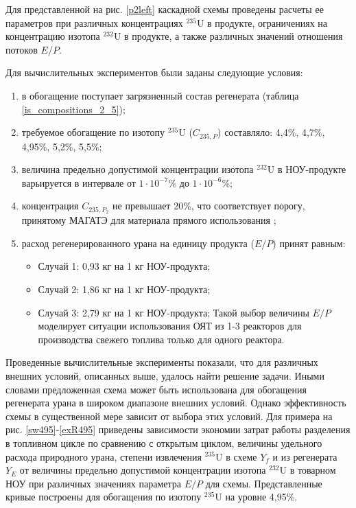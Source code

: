 Для представленной на рис. \ref{p2left} каскадной схемы проведены расчеты ее параметров при различных концентрациях $^{235}$U в продукте, ограничениях на концентрацию изотопа $^{232}$U в продукте, а также различных значений отношения потоков $E$/$P$.

Для вычислительных экспериментов были заданы следующие условия:

\begin{enumerate}
    \item в обогащение поступает загрязненный состав регенерата (таблица \ref{is_compositions_2_5}); 
    \item требуемое обогащение по изотопу $^{235}$U ($C_{235,P}$) составляло: 4,4\%, 4,7\%, 4,95\%, 5,2\%, 5,5\%;    
    \item величина предельно допустимой концентрации изотопа $^{232}$U в НОУ-продукте варьируется в интервале от $1\cdot10^{-7}$\% до $1\cdot10^{-6}$\%;
    \item концентрация $C_{235,{P_2}}$ не превышает 20\%, что соответствует порогу, принятому МАГАТЭ для материала прямого использования \cite{alekseevConceptUseRecycled2010};
    \item расход регенерированного урана на единицу продукта ($E/P$) принят равным:
    \begin{itemize}
        \item Случай 1: 0,93 кг на 1 кг НОУ-продукта;
        \item Случай 2: 1,86 кг на 1 кг НОУ-продукта;
        \item Случай 3: 2,79 кг на 1 кг НОУ-продукта;        
        Такой выбор величины $E/P$ моделирует ситуации использования ОЯТ из 1-3 реакторов для производства свежего топлива только для одного реактора.
    \end{itemize}
\end{enumerate}

Проведенные вычислительные эксперименты показали, что для различных внешних условий, описанных выше, удалось найти решение задачи. Иными словами предложенная схема может быть использована для обогащения регенерата урана в широком диапазоне внешних условий. Однако эффективность схемы в существенной мере зависит от выбора этих условий. Для примера на рис. \ref{sw495}-\ref{exR495} приведены зависимости экономии затрат работы разделения в топливном цикле по сравнению с открытым циклом, величины удельного расхода природного урана, степени извлечения $^{235}$U в схеме $Y_f$ и из регенерата $Y_{E}$ от величины предельно допустимой концентрации изотопа $^{232}$U в товарном НОУ при различных значениях параметра $E/P$ для схемы. Представленные кривые построены для обогащения по изотопу $^{235}$U на уровне 4,95\%.

